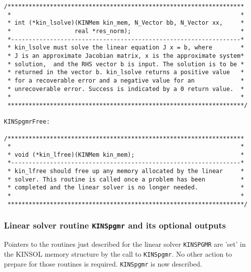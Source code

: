 \begin{verbatim}
/*******************************************************************
 *                                                                 *
 * int (*kin_lsolve)(KINMem kin_mem, N_Vector bb, N_Vector xx,     *
 *                  real *res_norm);                               *
 *-----------------------------------------------------------------*
 * kin_lsolve must solve the linear equation J x = b, where        *
 * J is an approximate Jacobian matrix, x is the approximate system*
 * solution,  and the RHS vector b is input. The solution is to be *
 * returned in the vector b. kin_lsolve returns a positive value   *
 * for a recoverable error and a negative value for an             *
 * unrecoverable error. Success is indicated by a 0 return value.  *
 *                                                                 *
 *******************************************************************/

KINSpgmrFree:

/*******************************************************************
 *                                                                 *
 * void (*kin_lfree)(KINMem kin_mem);                              *
 *-----------------------------------------------------------------*
 * kin_lfree should free up any memory allocated by the linear     *
 * solver. This routine is called once a problem has been          *
 * completed and the linear solver is no longer needed.            *
 *                                                                 *
 *******************************************************************/

\end{verbatim}
\normalsize

\subsubsection{Linear solver routine {\tt KINSpgmr} and its optional outputs}

Pointers to the routines just described for the linear solver {\tt KINSPGMR} 
are 'set' in the KINSOL memory structure by the call to {\tt KINSpgmr}. No 
other action to prepare for those routines is required. {\tt KINSpgmr} is now 
described.

